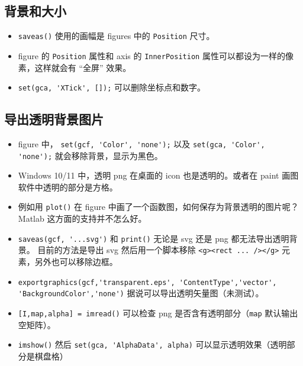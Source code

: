 
\subsection{背景和大小}
\begin{itemize}
\item \verb`saveas()` 使用的画幅是 figures 中的 \verb`Position` 尺寸。
\item figure 的 \verb`Position` 属性和 axis 的 \verb`InnerPosition` 属性可以都设为一样的像素，这样就会有 “全屏” 效果。
\item \verb`set(gca, 'XTick', []);` 可以删除坐标点和数字。
\end{itemize}

\subsection{导出透明背景图片}
\begin{itemize}
\item figure 中， \verb`set(gcf, 'Color', 'none');` 以及 \verb`set(gca, 'Color', 'none');` 就会移除背景，显示为黑色。
\item Windows 10/11 中，透明 png 在桌面的 icon 也是透明的。或者在 paint 画图软件中透明的部分是方格。
\item 例如用 \verb`plot()` 在 figure 中画了一个函数图，如何保存为背景透明的图片呢？ Matlab 这方面的支持并不怎么好。
\item \verb`saveas(gcf, '...svg')` 和 \verb`print()` 无论是 svg 还是 png 都无法导出透明背景。 目前的方法是导出 svg 然后用一个脚本移除 \verb`<g><rect ... /></g>` 元素，另外也可以移除边框。
\item \verb`exportgraphics(gcf,'transparent.eps', 'ContentType','vector', 'BackgroundColor','none')` 据说可以导出透明矢量图（未测试）。
\item \verb`[I,map,alpha] = imread()` 可以检查 png 是否含有透明部分（\verb`map` 默认输出空矩阵）。
\item \verb`imshow()` 然后 \verb`set(gca, 'AlphaData', alpha)` 可以显示透明效果（透明部分是棋盘格）
\end{itemize}
